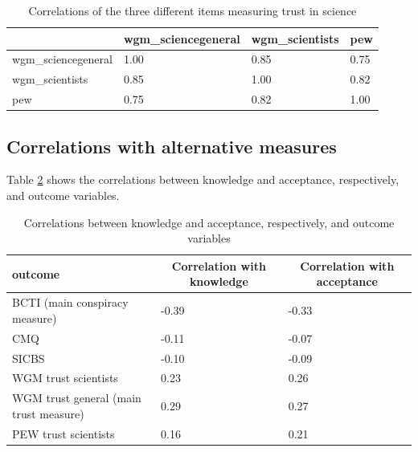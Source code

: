 \documentclass[
  doc,floatsintext]{apa6}
\begin{document}
\begin{table}[h]

\begin{center}
\begin{threeparttable}

\caption{\label{tab:correlation-trust}Correlations of the three different items measuring trust in science}

\begin{tabular}{llll}
\toprule
 & \multicolumn{1}{c}{wgm\_sciencegeneral} & \multicolumn{1}{c}{wgm\_scientists} & \multicolumn{1}{c}{pew}\\
\midrule
wgm\_sciencegeneral & 1.00 & 0.85 & 0.75\\
wgm\_scientists & 0.85 & 1.00 & 0.82\\
pew & 0.75 & 0.82 & 1.00\\
\bottomrule
\end{tabular}

\end{threeparttable}
\end{center}

\end{table}

\hypertarget{correlations-with-alternative-measures}{%
\subsection{Correlations with alternative measures}\label{correlations-with-alternative-measures}}

Table \ref{tab:correlations-outcomes} shows the correlations between knowledge and acceptance, respectively, and outcome variables.

\begin{table}[tbp]

\begin{center}
\begin{threeparttable}

\caption{\label{tab:correlations-outcomes}Correlations between knowledge and acceptance, respectively, and outcome variables}

\begin{tabular}{lll}
\toprule
outcome & \multicolumn{1}{c}{Correlation with knowledge} & \multicolumn{1}{c}{Correlation with acceptance}\\
\midrule
BCTI 
(main conspiracy measure) & -0.39 & -0.33\\
CMQ & -0.11 & -0.07\\
SICBS & -0.10 & -0.09\\
WGM trust scientists & 0.23 & 0.26\\
WGM trust general 
(main trust measure) & 0.29 & 0.27\\
PEW trust scientists & 0.16 & 0.21\\
\bottomrule
\end{tabular}

\end{threeparttable}
\end{center}

\end{table}
\end{document}
